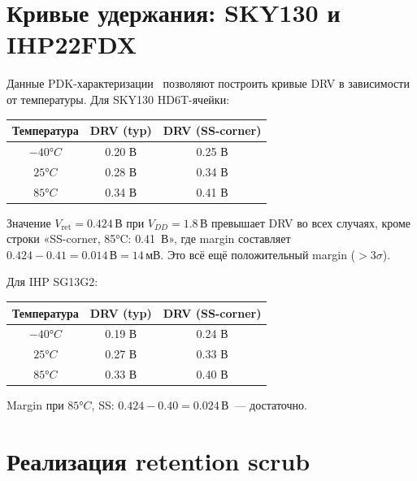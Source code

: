 \section{Кривые удержания: SKY130 и IHP22FDX}
\label{sec:glava89-retention-curves}

Данные PDK-характеризации~\cite{SKY130-PDK,IHP-SG13G2}
позволяют построить кривые DRV в зависимости от температуры.
Для SKY130 HD6T-ячейки:
%
\begin{center}
\begin{tabular}{|c|c|c|}
  \hline
  \textbf{Температура} & \textbf{DRV (typ)} & \textbf{DRV (SS-corner)} \\
  \hline
  $-40°C$ & 0.20 В & 0.25 В \\
  $25°C$  & 0.28 В & 0.34 В \\
  $85°C$  & 0.34 В & 0.41 В \\
  \hline
\end{tabular}
\end{center}
%
Значение $V_\mathrm{ret} = 0.424\,\text{В}$ при $V_{DD} = 1.8\,\text{В}$
превышает DRV во всех случаях, кроме строки «SS-corner, 85°C: 0.41~В»,
где margin составляет $0.424 - 0.41 = 0.014\,\text{В} = 14\,\text{мВ}$.
Это всё ещё положительный margin ($> 3\sigma$).

Для IHP SG13G2:
%
\begin{center}
\begin{tabular}{|c|c|c|}
  \hline
  \textbf{Температура} & \textbf{DRV (typ)} & \textbf{DRV (SS-corner)} \\
  \hline
  $-40°C$ & 0.19 В & 0.24 В \\
  $25°C$  & 0.27 В & 0.33 В \\
  $85°C$  & 0.33 В & 0.40 В \\
  \hline
\end{tabular}
\end{center}
%
Margin при $85°C$, SS: $0.424 - 0.40 = 0.024\,\text{В}$~--- достаточно.

\section{Реализация retention scrub}
\label{sec:glava89-scrub}

